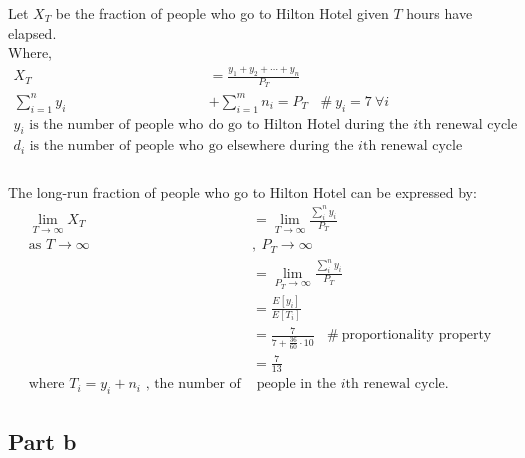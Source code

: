 \documentclass[a4paper, fleqn]{article}
\begin{document}
Let $X_T$ be the fraction of people who go to Hilton Hotel given $T$ hours have elapsed.\\
Where,
$$\begin{aligned}
X_T&=\frac{y_1+y_2+\cdots+y_n}{P_T}\\
\sum_{i=1}^n y_i&+\sum_{i=1}^m n_i=P_T\ \ \ \ \#\ y_i=7\ \forall i\\
y_i\text{ is the number of people who }&\text{do go to Hilton Hotel during the }i\text{th renewal cycle}\\
d_i\text{ is the number of people who }&\text{go elsewhere during the }i\text{th renewal cycle}\\
\end{aligned}$$\\
The long-run fraction of people who go to Hilton Hotel can be expressed by:
$$
\begin{aligned}
\lim_{T\rightarrow\infty}X_T&=\lim_{T\rightarrow\infty}\frac{\sum_i^n y_i}{P_T}\\
\text{as }T\rightarrow\infty\ &,\ P_T\rightarrow\infty\\
&=\lim_{P_T\rightarrow\infty}\frac{\sum_i^n y_i}{P_T}\\
&=\frac{E[y_i]}{E[T_i]}\\
&=\frac{7}{7+\frac{36}{60}\cdot10}\ \ \ \ \#\ \text{proportionality property}\\
&=\frac{7}{13}\\
\text{where }T_i=y_i+n_i\text{ , the number of}&\text{ people in the }i\text{th renewal cycle.}
\end{aligned}
$$
\pagebreak
\subsection{Part b}
\end{document}
